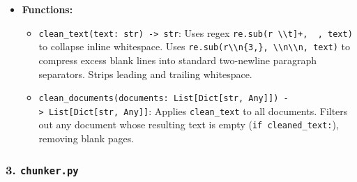 \documentclass[
]{article}
\providecommand{\tightlist}{%
  \setlength{\itemsep}{0pt}\setlength{\parskip}{0pt}}
\begin{document}
\begin{itemize}
\tightlist
\item
  \textbf{Functions:}

  \begin{itemize}
  \tightlist
  \item
    \texttt{clean\_\allowbreak text(\allowbreak text:\ \allowbreak str)\allowbreak \ \allowbreak -\textgreater{}\allowbreak \ \allowbreak str}: Uses regex
    \texttt{re.\allowbreak sub(\allowbreak r\textquotesingle{}{[}\ \allowbreak \textbackslash{}\textbackslash{}t{]}+\textquotesingle{},\allowbreak \ \allowbreak \textquotesingle{}\ \allowbreak \textquotesingle{},\allowbreak \ \allowbreak text)\allowbreak }
    to collapse inline whitespace. Uses
    \texttt{re.\allowbreak sub(\allowbreak r\textquotesingle{}\textbackslash{}\textbackslash{}n\{3,\allowbreak \}\textquotesingle{},\allowbreak \ \allowbreak \textquotesingle{}\textbackslash{}\textbackslash{}n\textbackslash{}\textbackslash{}n\textquotesingle{},\allowbreak \ \allowbreak text)\allowbreak }
    to compress excess blank lines into standard two-newline paragraph
    separators. Strips leading and trailing whitespace.
  \item
    \texttt{clean\_\allowbreak documents(\allowbreak documents:\ \allowbreak List{[}Dict{[}str,\allowbreak \ \allowbreak Any{]}{]})\allowbreak \ \allowbreak -\textgreater{}\allowbreak \ \allowbreak List{[}Dict{[}str,\allowbreak \ \allowbreak Any{]}{]}}:
    Applies \texttt{clean\_\allowbreak text} to all documents. Filters out any
    document whose resulting text is empty
    (\texttt{if\ \allowbreak cleaned\_\allowbreak text:}), removing blank pages.
  \end{itemize}
\end{itemize}

\subsubsection{\texorpdfstring{3.
\texttt{chunker.\allowbreak py}}{3. chunker.py}}\label{chunker.py}
\end{document}

